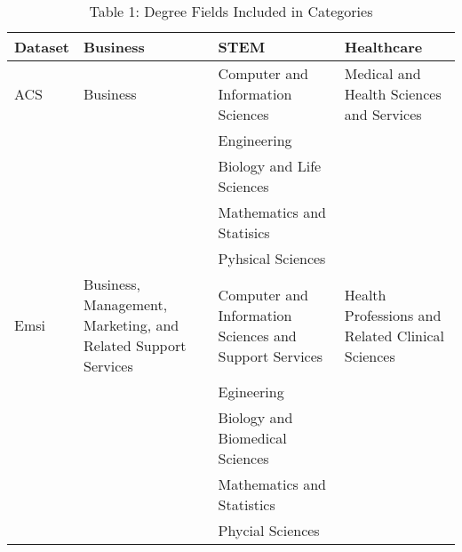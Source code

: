 \documentclass{article}
\begin{document}
\begin{table}[ht]
\centering
\caption*{Table 1: Degree Fields Included in Categories}
\begin{tabular}{llll}
\hline
	Dataset&Business& STEM& Healthcare \\
\hline
	ACS& Business& Computer and Information Sciences& Medical and Health Sciences and Services\\
	&& Engineering&\\
	&&Biology and Life Sciences&\\
	&&Mathematics and Statisics&\\
	&&Pyhsical Sciences&\\
\hline
	Emsi&Business, Management, Marketing, and Related Support Services& Computer and Information Sciences and Support Services&Health Professions and Related Clinical Sciences\\
	&&Egineering&\\
	&&Biology and Biomedical Sciences&\\
	&&Mathematics and Statistics&\\
	&&Phycial Sciences&\\
\hline
\end{tabular}
\end{table}
\end{document}

